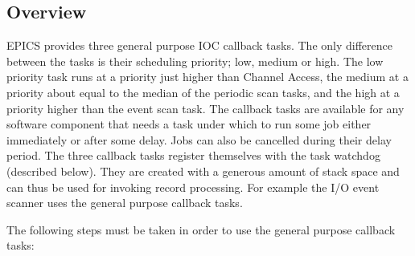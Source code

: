 \subsection{Overview}

EPICS provides three general purpose IOC callback tasks. The only difference between the tasks is their scheduling 
priority; low, medium or high. The low priority task runs at a priority just higher than Channel Access, the medium at a 
priority about equal to the median of the periodic scan tasks, and the high at a priority higher than the event scan task. The 
callback tasks are available for any software component that needs a task under which to run some job either immediately 
or after some delay. Jobs can also be cancelled during their delay period. The three callback tasks register themselves with 
the task watchdog (described below). They are created with a generous amount of stack space and can thus be used for 
invoking record processing. For example the I/O event scanner uses the general purpose callback tasks.

The following steps must be taken in order to use the general purpose callback tasks: 

